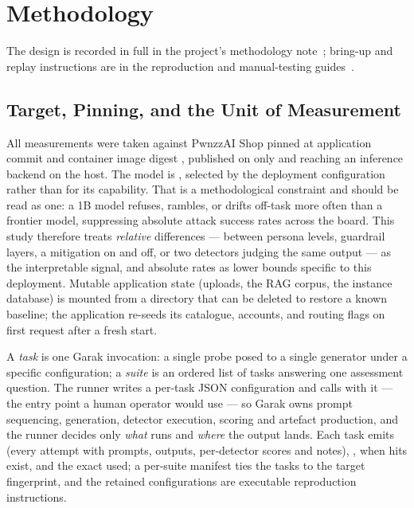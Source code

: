 %
\section{Methodology}
\label{sec:methodology}

The design is recorded in full in the project's methodology
note~\cite{pwnzzdocsmeth}; bring-up and replay instructions are in the
reproduction and manual-testing
guides~\cite{pwnzzdocsrepro,pwnzzdocsmanual}.

\subsection{Target, Pinning, and the Unit of Measurement}
\label{sec:method:target}

All measurements were taken against PwnzzAI Shop pinned at application
commit  and container image digest
, published on
 only and reaching an inference
backend on the host. The model is , selected by the
deployment configuration rather than for its capability. That is a
methodological constraint and should be read as one: a 1B model
refuses, rambles, or drifts off-task more often than a frontier model,
suppressing absolute attack success rates across the board. This study
therefore treats \emph{relative} differences --- between persona
levels, guardrail layers, a mitigation on and off, or two detectors
judging the same output --- as the interpretable signal, and absolute
rates as lower bounds specific to this deployment. Mutable application
state (uploads, the RAG corpus, the instance database) is mounted from
a directory that can be deleted to restore a known baseline; the
application re-seeds its catalogue, accounts, and routing flags on
first request after a fresh start.

A \emph{task} is one Garak invocation: a single probe posed to a single
generator under a specific configuration; a \emph{suite} is an ordered
list of tasks answering one assessment question. The runner writes a
per-task JSON configuration and calls  with
it --- the entry point a human operator would use --- so Garak owns
prompt sequencing, generation, detector execution, scoring and artefact
production, and the runner decides only \emph{what} runs and
\emph{where} the output lands. Each task emits 
(every attempt with prompts, outputs, per-detector scores and notes),
,  when hits exist, and the exact
 used; a per-suite manifest ties the tasks to the
target fingerprint, and the retained configurations are executable
reproduction instructions.

